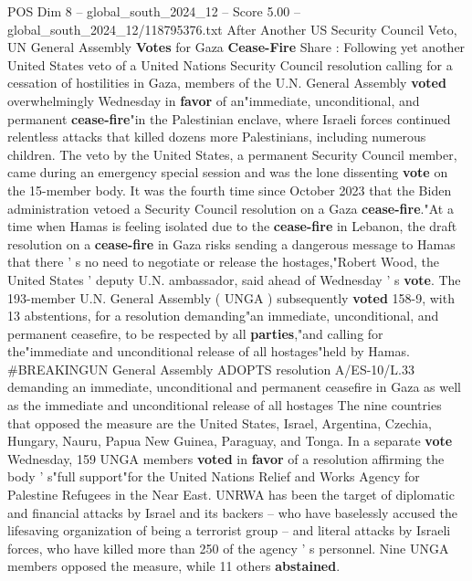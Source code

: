 \begin{textsample}{POS Dim 8 – global\_south\_2024\_12 – Score 5.00 – global\_south\_2024\_12/118795376.txt}  \label{ex:f8_pos_354}
After Another US Security Council Veto, UN General Assembly \textbf{Votes} for Gaza \textbf{Cease-Fire} Share : Following yet another United States veto of a United Nations Security Council resolution calling for a cessation of hostilities in Gaza, members of the U.N.
General Assembly \textbf{voted} overwhelmingly Wednesday in \textbf{favor} of an"immediate, unconditional, and permanent \textbf{cease-fire}"in the Palestinian enclave, where Israeli forces continued relentless attacks that killed dozens more Palestinians, including numerous children.
The veto by the United States, a permanent Security Council member, came during an emergency special session and was the lone dissenting \textbf{vote} on the 15-member body.
It was the fourth time since October 2023 that the Biden administration vetoed a Security Council resolution on a Gaza \textbf{cease-fire}."At a time when Hamas is feeling isolated due to the \textbf{cease-fire} in Lebanon, the draft resolution on a \textbf{cease-fire} in Gaza risks sending a dangerous message to Hamas that there ' s no need to negotiate or release the hostages,"Robert Wood, the United States ' deputy U.N. ambassador, said ahead of Wednesday ' s \textbf{vote}.
The 193-member U.N.
General Assembly ( UNGA ) subsequently \textbf{voted} 158-9, with 13 abstentions, for a resolution demanding"an immediate, unconditional, and permanent ceasefire, to be respected by all \textbf{parties},"and calling for the"immediate and unconditional release of all hostages"held by Hamas. \#BREAKINGUN General Assembly ADOPTS resolution A/ES-10/L.33 demanding an immediate, unconditional and permanent ceasefire in Gaza as well as the immediate and unconditional release of all hostages The nine countries that opposed the measure are the United States, Israel, Argentina, Czechia, Hungary, Nauru, Papua New Guinea, Paraguay, and Tonga.
In a separate \textbf{vote} Wednesday, 159 UNGA members \textbf{voted} in \textbf{favor} of a resolution affirming the body ' s"full support"for the United Nations Relief and Works Agency for Palestine Refugees in the Near East.
UNRWA has been the target of diplomatic and financial attacks by Israel and its backers -- who have baselessly accused the lifesaving organization of being a terrorist group -- and literal attacks by Israeli forces, who have killed more than 250 of the agency ' s personnel.
Nine UNGA members opposed the measure, while 11 others \textbf{abstained}.

\end{textsample}
